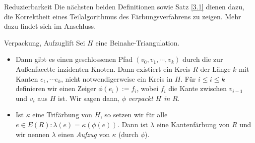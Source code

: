 \begin{section}{Reduzierbarkeit}
 Die nächsten beiden Definitionen sowie Satz \ref{3.1} dienen dazu, die Korrektheit eines Teilalgorithmus des Färbungsverfahrens zu zeigen. Mehr dazu findet sich im Anschluss.
 
 \begin{definitionl}{Verpackung, Aufzug}{lift}
  Sei $H$ eine Beinahe-Triangulation. 
  \begin{itemize}
   \item Dann gibt es einen geschlossenen Pfad $(v_0,v_1,\cdots,v_k)$ durch die zur Außenfacette inzidenten Knoten. Dann existiert ein Kreis $R$ der Länge $k$ mit Kanten $e_1,\cdots e_k$, nicht notwendigerweise ein Kreis in $H$. Für $i \leq i \leq k$ definieren wir einen Zeiger $\phi(e_i) := f_i$, wobei $f_i$ die Kante zwischen $v_{i-1}$ und $v_i$ aus $H$ ist. Wir sagen dann, $\phi$ \textit{verpackt $H$ in $R$}. 
   \item Ist $\kappa$ eine Trifärbung von $H$, so setzen wir für alle $e \in E(R): \lambda(e) = \kappa(\phi(e))$. Dann ist $\lambda$ eine Kantenfärbung von $R$ und wir nennen $\lambda$ einen \textit{Aufzug} von $\kappa$ (durch $\phi$).
  \end{itemize}
 \end{definitionl}
 

\end{section}
